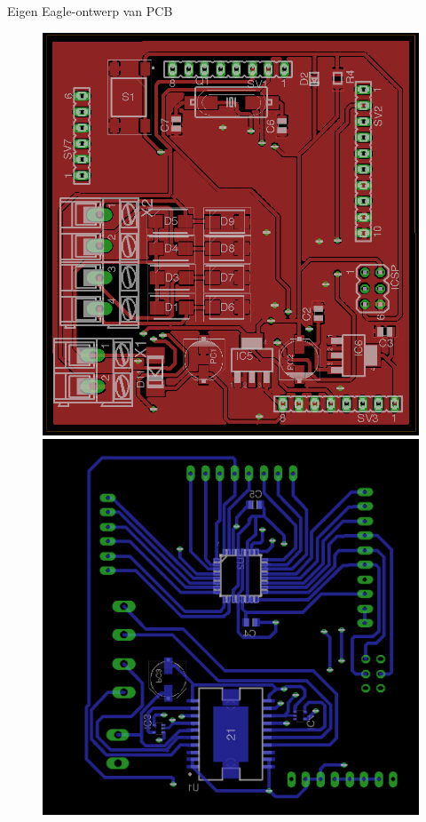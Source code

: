 \documentclass[t,12pt,english
\ifx\beamermode\undefined\else,\beamermode\fi
]{beamer}
\begin{document}
\begin{frame}{Eigen Eagle-ontwerp van PCB}
\begin{figure}[H]
	\centering
	\begin{minipage}[b]{0.4\textwidth}
		\centering
		\includegraphics[width=\textwidth,height=0.8\textheight,keepaspectratio]{topboard.png}
	\end{minipage}
	\hfill
	\begin{minipage}[b]{0.4\textwidth}
		\centering
		\includegraphics[width=\textwidth,height=0.8\textheight,keepaspectratio]{bottomboard.png}
	\end{minipage}
\end{figure}
\end{frame}
\end{document}
